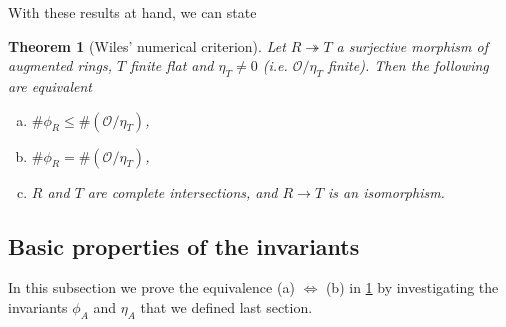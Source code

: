 \documentclass{article}
\theoremstyle{plain}%
\newtheorem{theorem}{Theorem}[section]
\theoremstyle{definition}
\theoremstyle{remark}
\begin{document}
    With these results at hand, we can state 
    \begin{theorem}[Wiles' numerical criterion]\label{thm:wiles_numerical_criterion}
        Let \(R \twoheadrightarrow T\) a surjective morphism of augmented rings, \(T\) finite flat and \(\eta_T \neq 0\) 
        (i.e. \(\mathcal{O}/\eta_T\) finite).
        Then the following are equivalent
        \begin{enumerate}[(a)]
            \item \(\# \phi_R \le \#(\mathcal{O}/\eta_T)\),
            \item \(\# \phi_R = \#(\mathcal{O}/\eta_T)\),
            \item \(R\) and \(T\) are complete intersections, and \(R \to T\) is an isomorphism.
        \end{enumerate}
    \end{theorem}

    \subsection{Basic properties of the invariants}
    In this subsection we prove the equivalence (a) \(\Leftrightarrow\) (b) in \cref{thm:wiles_numerical_criterion}
    by investigating the invariants \(\phi_A\) and \(\eta_A\) that we defined last section.
\end{document}
